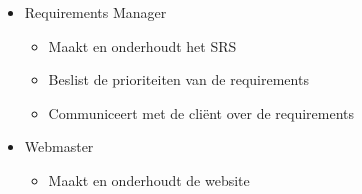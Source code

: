 \begin{itemize}
\item Requirements Manager
\begin{itemize}
\item Maakt en onderhoudt het SRS
\item Beslist de prioriteiten van de requirements
\item Communiceert met de cliënt over de requirements
\end{itemize}

\item Webmaster 
\begin{itemize}
\item Maakt en onderhoudt de website
\end{itemize}
\end{itemize}
 \newpage

